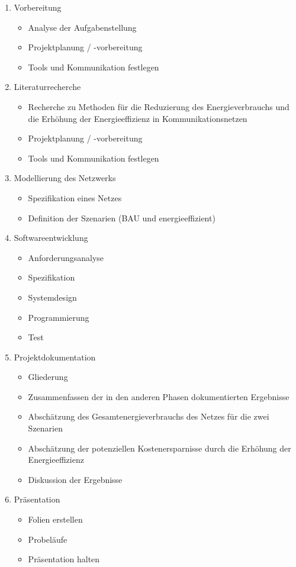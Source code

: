 \documentclass[12pt,titlepage]{article}
\begin{document}
\begin{enumerate}
\item Vorbereitung
\begin{itemize}
\item Analyse der Aufgabenstellung
\item Projektplanung / -vorbereitung
\item Tools und Kommunikation festlegen
\end{itemize}

\item Literaturrecherche
\begin{itemize}
\item Recherche zu Methoden für die Reduzierung des Energieverbrauchs und die Erhöhung der Energieeffizienz in Kommunikationsnetzen
\item Projektplanung / -vorbereitung
\item Tools und Kommunikation festlegen
\end{itemize}

\item Modellierung des Netzwerks
\begin{itemize}
\item Spezifikation eines Netzes
\item Definition der Szenarien (BAU und energieeffizient)
\end{itemize}

\item Softwareentwicklung
\begin{itemize}
\item Anforderungsanalyse
\item Spezifikation
\item Systemdesign
\item Programmierung
\item Test
\end{itemize}
\item Projektdokumentation
\begin{itemize}
\item Gliederung
\item Zusammenfassen der in den anderen Phasen dokumentierten Ergebnisse
\item Abschätzung des Gesamtenergieverbrauchs des Netzes für die zwei Szenarien
\item Abschätzung der potenziellen Kostenersparnisse durch die Erhöhung der Energieeffizienz
\item Diskussion der Ergebnisse
\end{itemize}

\item Präsentation
\begin{itemize}
\item Folien erstellen
\item Probeläufe
\item Präsentation halten

\end{itemize}

\end{enumerate}
\end{document}
